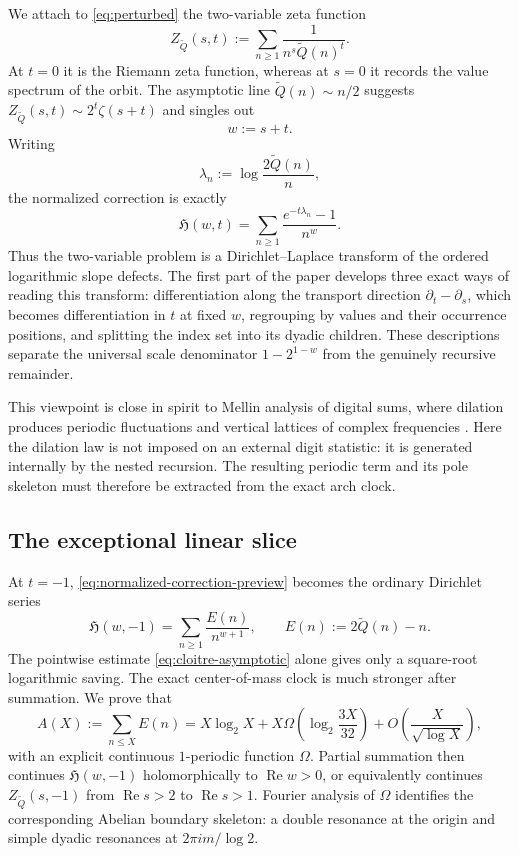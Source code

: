 \documentclass[11pt]{article}
\theoremstyle{definition}
\theoremstyle{remark}
\newcommand{\Qp}{\widetilde Q}
\newcommand{\RePart}{\operatorname{Re}}
\newcommand{\Hz}{\mathfrak H}
\begin{document}
We attach to \eqref{eq:perturbed} the two-variable zeta function
\begin{equation}
 {
 Z_{\Qp}(s,t):=\sum_{n\ge1}\frac{1}{n^s\Qp(n)^t}.}
 \label{eq:two-variable-zeta}
\end{equation}
At $t=0$ it is the Riemann zeta function, whereas at $s=0$ it records the
value spectrum of the orbit.  The asymptotic line $\Qp(n)\sim n/2$ suggests
$Z_{\Qp}(s,t)\sim2^t\zeta(s+t)$ and singles out
\[
 w:=s+t.
\]
Writing
\[
 \lambda_n:=\log\frac{2\Qp(n)}n,
\]
the normalized correction is exactly
\begin{equation}
 {
 \Hz(w,t)=\sum_{n\ge1}\frac{e^{-t\lambda_n}-1}{n^w}.}
 \label{eq:normalized-correction-preview}
\end{equation}
Thus the two-variable problem is a Dirichlet--Laplace transform of the
ordered logarithmic slope defects.  The first part of the paper develops
three exact ways of reading this transform: differentiation along the
transport direction $\partial_t-\partial_s$, which becomes differentiation
in \(t\) at fixed \(w\), regrouping by values and their occurrence positions,
and splitting the index set into its dyadic children.  These descriptions
separate the universal scale denominator \(1-2^{1-w}\) from the genuinely
recursive remainder.

This viewpoint is close in spirit to Mellin analysis of digital sums,
where dilation produces periodic fluctuations and vertical lattices of
complex frequencies \cite{Delange1975,FlajoletGrabnerKirschenhofer1994,
FlajoletGourdonDumas1995}.  Here the dilation law is not imposed on an
external digit statistic: it is generated internally by the nested
recursion.  The resulting periodic term and its pole skeleton must
therefore be extracted from the exact arch clock.

\subsection{The exceptional linear slice}

At $t=-1$, \eqref{eq:normalized-correction-preview} becomes the ordinary
Dirichlet series
\begin{equation}
 \Hz(w,-1)=\sum_{n\ge1}\frac{E(n)}{n^{w+1}},
 \qquad E(n):=2\Qp(n)-n.
 \label{eq:intro-tminus1}
\end{equation}
The pointwise estimate \eqref{eq:cloitre-asymptotic} alone gives only a
square-root logarithmic saving.  The exact center-of-mass clock is much
stronger after summation.  We prove that
\begin{equation}
 A(X):=\sum_{n\le X}E(n)
 =X\log_2X+X\Omega\!\left(\log_2\frac{3X}{32}\right)
 +O\!\left(\frac{X}{\sqrt{\log X}}\right),
 \label{eq:intro-summatory}
\end{equation}
with an explicit continuous $1$-periodic function $\Omega$.  Partial
summation then continues $\Hz(w,-1)$ holomorphically to $\RePart w>0$,
or equivalently continues $Z_{\Qp}(s,-1)$ from $\RePart s>2$ to
$\RePart s>1$.  Fourier analysis of $\Omega$ identifies the corresponding
Abelian boundary skeleton: a double resonance at the origin and simple
dyadic resonances at $2\pi i m/\log2$.
\end{document}
